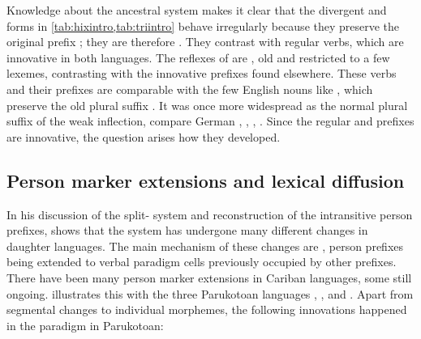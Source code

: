 Knowledge about the ancestral system makes it clear that the divergent \hixka and \trio forms in \cref{tab:hixintro,tab:triintro} behave irregularly because they preserve the original \PC {} prefix ; they are therefore .
They contrast with regular  verbs, which are innovative in both languages.
The reflexes of  are , old and restricted to a few lexemes, contrasting with the innovative prefixes found elsewhere.
These verbs and their prefixes are comparable with the few English nouns like , which preserve the old plural suffix .
It was once more widespread as the normal plural suffix of the weak inflection, compare German  ,  ,  ,  .
Since the regular \hixka and \trio prefixes are innovative, the question arises how they developed.


%

\subsection{Person marker extensions and lexical diffusion}
\label{sec:extensions_intro}
In his discussion of the \PC split- system  and reconstruction of the intransitive person prefixes, \textcite[88--96]{gildea1998} shows that the system has undergone many different changes in daughter languages.
The main mechanism of these changes are , person prefixes being extended to verbal paradigm cells previously occupied by other prefixes.
There have been many person marker extensions in Cariban languages, some still ongoing.
\textcite{gildea1998} illustrates this with the three Parukotoan languages \kaxui, \hixka, and \waiwai.
Apart from segmental changes to individual morphemes, the following innovations happened in the \setone paradigm in Parukotoan:

